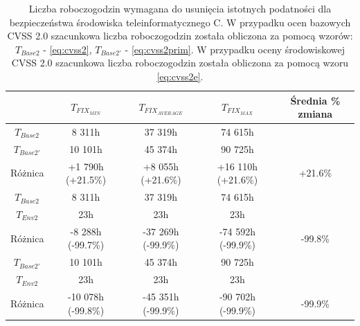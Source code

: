 \begin{table}[tbh]
\caption{Liczba roboczogodzin wymagana do usunięcia istotnych podatności dla bezpieczeństwa środowiska teleinformatycznego C. W przypadku ocen bazowych CVSS 2.0 szacunkowa liczba roboczogodzin została obliczona za pomocą wzorów: $T_{Base2}$ - \ref{eq:cvss2}, $T_{Base2'}$ - \ref{eq:cvss2prim}. W przypadku oceny środowiskowej CVSS 2.0 szacunkowa liczba roboczogodzin została obliczona za pomocą wzoru \ref{eq:cvss2e}.}
\begin{center}
\label{tab:chapter6:env_c:time_results_cvss2}
\begin{tabular}{c|ccc|c}
\hline
                 & \textbf{$T_{FIX_{MIN}}$} & \textbf{$T_{FIX_{AVERAGE}}$} & \textbf{$T_{FIX_{MAX}}$ }  & Średnia \% zmiana \\
\hline
$T_{Base2}$      &                      8 311h &         37 319h   &  74 615h           &        \\
$T_{Base2'}$     &                     10 101h &         45 374h   &  90 725h           &         \\
Różnica          &           +1 790h (+21.5\%) & +8 055h (+21.6\%) & +16 110h (+21.6\%) & +21.6\%   \\  
\hline
$T_{Base2}$     &                       8 311h &           37 319h &  74 615h        &         \\
$T_{Env2}$        &                        23h &               23h &     23h         &         \\
Różnica          &           -8 288h (-99.7\%) & -37 269h (-99.9\%) & -74 592h (-99.9\%) & -99.8\% \\  
\hline
$T_{Base2'}$     &                      10 101h &       45 374h    &  90 725h        &         \\
$T_{Env2}$        &                        23h &               23h  &     23h        &         \\
Różnica          &           -10 078h (-99.8\%) & -45 351h (-99.9\%) & -90 702h (-99.9\%) & -99.9\% \\  
\hline
\end{tabular}
\end{center}
\end{table}

